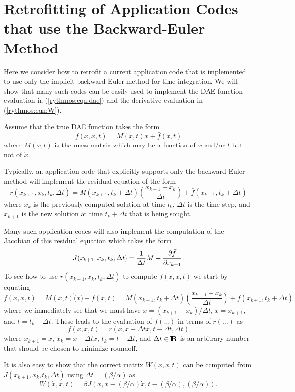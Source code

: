 \documentclass[pdf,ps2pdf,11pt]{SANDreport}
\begin{document}
\section{Retrofitting of Application Codes that use the Backward-Euler Method}

Here we consider how to retrofit a current application code that is
implemented to use only the implicit backward-Euler method for time
integration.  We will show that many such codes can be easily used to
implement the DAE function evaluation in (\ref{rythmos:eqn:dae}) and the
derivative evaluation in (\ref{rythmos:eqn:W}).

Assume that the true DAE function takes the form
%
\[
f(\dot{x},x,t) = M(x,t) \dot{x} + \bar{f}(x,t)
\]
%
where $M(x,t)$ is the mass matrix which may be a function of $x$ and/or $t$
but not of $\dot{x}$.

Typically, an application code that explicitly supports only the
backward-Euler method will implement the residual equation of the form
%
\[
r(x_{k+1},x_k,t_k,\Delta t)
= M(x_{k+1},t_k + \Delta t)\left(\frac{x_{k+1}-x_k}{\Delta t}\right)
+ \bar{f}(x_{k+1},t_k + \Delta t)
\]
%
where $x_k$ is the previously computed solution at time $t_k$,
$\Delta t$ is the time step, and $x_{k+1}$ is the new solution at time
$t_k + {}\Delta t$ that is being sought.

Many such application codes will also implement the computation of the
Jacobian of this residual equation which takes the form
%
\[
J(x_{k+1},x_k,t_k,\Delta t)
= \frac{1}{\Delta t} M + \displaystyle{\frac{\partial \bar{f}}{\partial x_{k+1}}}.
\]
%
To see how to use $r(x_{k+1},x_k,t_k,\Delta t)$ to compute
$f(\dot{x},x,t)$ we start by equating
%
\[
f(\dot{x},x,t) = M(x,t) \dot(x) + \bar{f}(x,t)
= M(x_{k+1},t_k + \Delta t)\left(\frac{x_{k+1}-x_k}{\Delta t}\right)
+ \bar{f}(x_{k+1},t_k + \Delta t)
\]
%
where we immediately see that we must have $\dot{x} =
(x_{k+1}-x_k)/{\Delta t}$, $x=x_{k+1}$, and $t=t_k+\Delta t$.
These leads to the evaluation of $f(\ldots)$ in terms of $r(\ldots)$ as
%
\[
f(\dot{x},x,t)
= r(x, x - \Delta t \dot{x},t - \Delta t, \Delta t)
\]
%
where $x_{k+1} = x$, $x_k = x - {}\Delta t {}\dot{x}$, $t_k = t - {}\Delta t$,
and $\Delta t\in\mbox{\textbf{I}}\hspace{-0.6ex}\mbox{\textbf{R}}$ is an arbitrary number that should be chosen to minimize
roundoff.

It is also easy to show that the correct matrix $W(\dot{x},x,t)$ can be
computed from $J(x_{k+1},x_k,t_k,\Delta t)$ using $\Delta t =
(\beta/\alpha)$ as
%
\[
W(\dot{x},x,t)
= \beta J(x, x - (\beta/\alpha) \dot{x},t - (\beta/\alpha), (\beta/\alpha)).
\]
%
\end{document}

